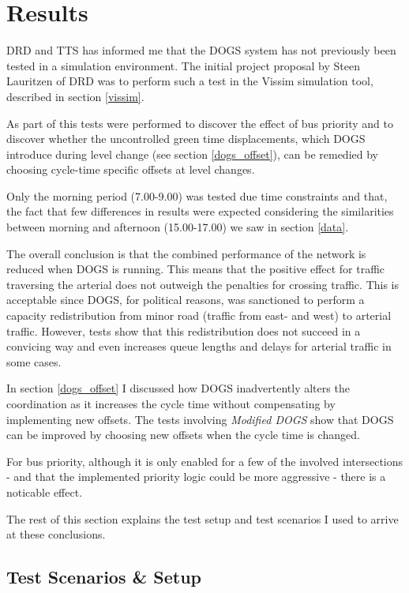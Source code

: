\section{Results}
\label{test}
DRD and TTS has informed me that the DOGS system has not previously been tested in a simulation environment. The initial project proposal by Steen Lauritzen of DRD was to perform such a test in the Vissim simulation tool, described in section \ref{vissim}.

As part of this tests were performed to discover the effect of bus priority and to discover whether the uncontrolled green time displacements, which DOGS introduce during level change (see section \ref{dogs_offset}), can be remedied by choosing cycle-time specific offsets at level changes.

Only the morning period (7.00-9.00) was tested due time constraints and that, the fact that few differences in results were expected considering the similarities between morning and afternoon (15.00-17.00) we saw in section \ref{data}.
 
The overall conclusion is that the combined performance of the network is reduced when DOGS is running. This means that the positive effect for traffic traversing the arterial does not outweigh the penalties for crossing traffic. 
This is acceptable since DOGS, for political reasons, was sanctioned to perform a capacity redistribution from minor road (traffic from east- and west) to arterial traffic. However, tests show that this redistribution does not succeed in a convicing way and even increases queue lengths and delays for arterial traffic in some cases.

In section \ref{dogs_offset} I discussed how DOGS inadvertently alters the coordination as it increases the cycle time without compensating by implementing new offsets. The tests involving \textit{Modified DOGS} show that DOGS can be improved by choosing new offsets when the cycle time is changed.

For bus priority, although it is only enabled for a few of the involved intersections - and that the implemented priority logic could be more aggressive - there is a noticable effect.

The rest of this section explains the test setup and test scenarios I used to arrive at these conclusions. 

\subsection{Test Scenarios \& Setup}

